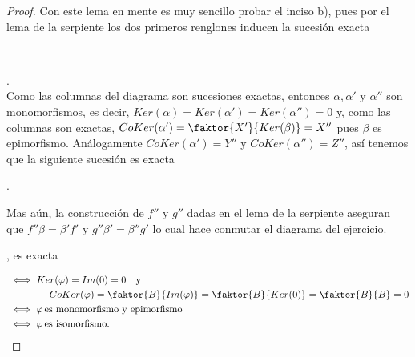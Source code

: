 \documentclass{article}
\begin{document}
\begin{enumerate}[label=\textbf{Ej \arabic*.}]
\begin{proof}
			Con este lema en mente es muy sencillo probar el inciso b), pues por el lema de la serpiente los dos primeros renglones inducen la
			sucesión exacta \\
			\\
			.\\
			Como las columnas del diagrama son sucesiones exactas, entonces $\alpha, \alpha'$ y $\alpha''$ son monomorfismos, es decir, 
			$Ker(\alpha)=Ker(\alpha')=Ker(\alpha'')=0$ y, como las columnas son exactas, $CoKer(\alpha')=\faktor{X'}{Ker(\beta)}=X''$
			pues $\beta$ es epimorfismo. Análogamente $CoKer(\alpha')=Y''$ y $CoKer(\alpha'')=Z''$, así tenemos que la siguiente sucesión 
			es exacta
			\begin{center}
				.
			\end{center}
			Mas aún, la construcción de $f''$ y $g''$ dadas en el lema de la serpiente aseguran que $f''\beta=\beta'f'$ y $g''\beta'=\beta''g'$ lo 
			cual hace conmutar el diagrama del ejercicio.\\
			\newpage
			\begin{center}
				, es exacta
			\end{center}
			\begin{align*}
				&\iff Ker(\varphi)=Im(0)=0\text{\quad y}\\
				& \hspace{1.5cm} CoKer(\varphi)=\faktor{B}{Im(\varphi)}=\faktor{B}{Ker(0)}=\faktor{B}{B}=0\\
				&\iff  \varphi \text{\,es monomorfismo y epimorfismo}\\
				&\iff \varphi \text{\,es isomorfismo}.
			\end{align*}
		\end{proof}
		

\end{enumerate}
\end{document}
